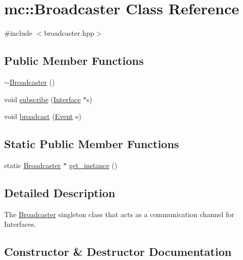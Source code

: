 \hypertarget{classmc_1_1Broadcaster}{}\section{mc\+:\+:Broadcaster Class Reference}
\label{classmc_1_1Broadcaster}


{\ttfamily \#include $<$broadcaster.\+hpp$>$}

\subsection*{Public Member Functions}
\begin{DoxyCompactItemize}
\item 
\hyperlink{classmc_1_1Broadcaster_a300986f66a31e98e6d539cf0f47ad826}{$\sim$\+Broadcaster} ()
\item 
void \hyperlink{classmc_1_1Broadcaster_aad912e54f0309b68f32fe1cd40e4abb5}{subscribe} (\hyperlink{classmc_1_1Interface}{Interface} $\ast$s)
\item 
void \hyperlink{classmc_1_1Broadcaster_a7779ed0c085d890e1a25af4f104bf8cc}{broadcast} (\hyperlink{classmc_1_1Event}{Event} e)
\end{DoxyCompactItemize}
\subsection*{Static Public Member Functions}
\begin{DoxyCompactItemize}
\item 
static \hyperlink{classmc_1_1Broadcaster}{Broadcaster} $\ast$ \hyperlink{classmc_1_1Broadcaster_a2f5d57c051b9dd3132529f79de43d178}{get\+\_\+instance} ()
\end{DoxyCompactItemize}


\subsection{Detailed Description}
The \hyperlink{classmc_1_1Broadcaster}{Broadcaster} singleton class that acts as a communication channel for Interfaces. 

\subsection{Constructor \& Destructor Documentation}
